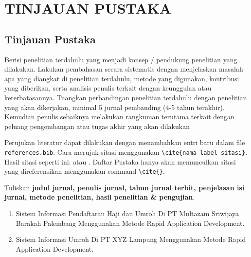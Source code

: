 \newpage
\chapter{TINJAUAN PUSTAKA} \label{Bab II}

\section{Tinjauan Pustaka} \label{II.Tinjauan}
Berisi penelitian terdahulu yang menjadi konsep / pendukung penelitian yang dilakukan. Lakukan pembahasan secara sistematis dengan menjelaskan masalah apa yang diangkat di penelitian terdahulu, metode yang digunakan, kontribusi yang diberikan, serta analisis penulis terkait dengan keunggulan atau keterbatasannya. Tuangkan perbandingan penelitian terdahulu dengan penelitian yang akan dikerjakan, minimal 5 jurnal pembanding (4-5 tahun terakhir). Kemudian penulis sebaiknya melakukan rangkuman terutama terkait dengan peluang pengembangan atau tugas akhir yang akan dilakukan \par

Perujukan literatur dapat dilakukan dengan menambahkan entri baru dalam file \verb|references.bib|. Cara merujuk sitasi menggunakan \verb|\cite{nama label sitasi}|. Hasil sitasi seperti ini: \cite{knuth2001art} atau \cite{Vogels2006Am}. Daftar Pustaka hanya akan memunculkan sitasi yang direferensikan menggunakan command \verb|\cite{}|. \par

Tuliskan \textbf{judul jurnal, penulis jurnal, tahun jurnal terbit, penjelasan isi jurnal, metode penelitian, hasil penelitian \& pengujian}. \par
\begin{enumerate}[noitemsep]
	\item Sistem Informasi Pendaftaran Haji dan Umroh Di PT Multazam Sriwijaya Barakah Palembang Menggunakan Metode Rapid Application Development. \blindtext
	\item Sistem Informasi Umroh Di PT XYZ Lampung Menggunakan Metode Rapid Application Development. \blindtext
\end{enumerate}

